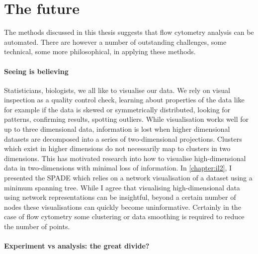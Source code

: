 \section{ The future }

The methods discussed in this thesis suggests that flow cytometry analysis can be automated.
There are however a number of outstanding challenges, some technical, some more philosophical, in applying these methods.

\paragraph{Seeing is believing}

Statisticians, biologists, we all like to visualise our data.
We rely on visual inspection as a quality control check, learning about properties of the data like for example if the data
is skewed or symmetrically distributed, looking for patterns, confirming results, spotting outliers.
While visualisation works well for up to three dimensional data,
information is lost when higher dimensional datasets are decomposed into a series of two-dimensional projections.
Clusters which exist in higher dimensions do not necessarily map to clusters in two dimensions.
This has motivated research into how to visualise high-dimensional data in two-dimensions with minimal loss of information.
In \cref{chapter:il2}, I presented the SPADE which relies on a network visualisation of a dataset using a minimum spanning tree.
While I agree that visualising high-dimensional data using network representations can be insightful,
beyond a certain number of nodes these visualisations can quickly become uninformative.
Certainly in the case of flow cytometry some clustering or data smoothing is required to reduce the number of points.  


\paragraph{Experiment vs analysis: the great divide?}


